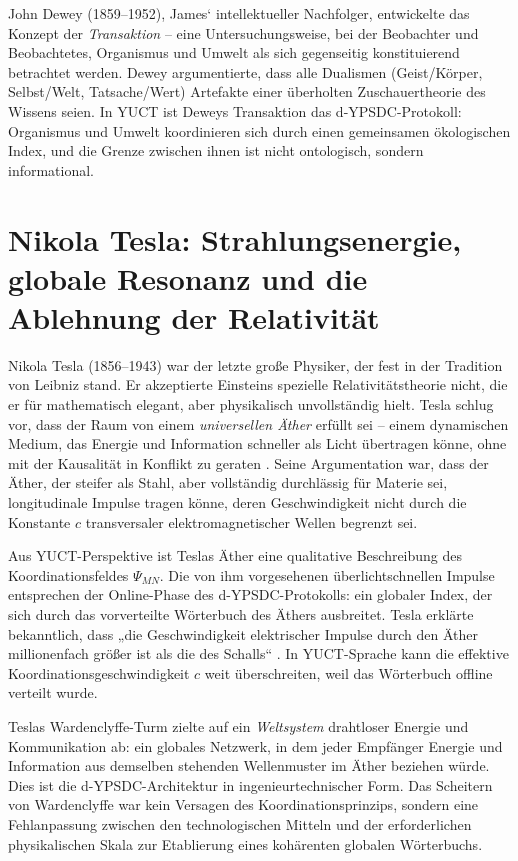 \documentclass[12pt,a4paper]{article}
\begin{document}
	John Dewey (1859–1952), James‘ intellektueller Nachfolger, entwickelte das Konzept der \emph{Transaktion} – eine Untersuchungsweise, bei der Beobachter und Beobachtetes, Organismus und Umwelt als sich gegenseitig konstituierend betrachtet werden. Dewey argumentierte, dass alle Dualismen (Geist/Körper, Selbst/Welt, Tatsache/Wert) Artefakte einer überholten Zuschauertheorie des Wissens seien. In YUCT ist Deweys Transaktion das d-YPSDC-Protokoll: Organismus und Umwelt koordinieren sich durch einen gemeinsamen ökologischen Index, und die Grenze zwischen ihnen ist nicht ontologisch, sondern informational.
	
	\section{Nikola Tesla: Strahlungsenergie, globale Resonanz und die Ablehnung der Relativität}
	
	Nikola Tesla (1856–1943) war der letzte große Physiker, der fest in der Tradition von Leibniz stand. Er akzeptierte Einsteins spezielle Relativitätstheorie nicht, die er für mathematisch elegant, aber physikalisch unvollständig hielt. Tesla schlug vor, dass der Raum von einem \emph{universellen Äther} erfüllt sei – einem dynamischen Medium, das Energie und Information schneller als Licht übertragen könne, ohne mit der Kausalität in Konflikt zu geraten \cite{Tesla1932}. Seine Argumentation war, dass der Äther, der steifer als Stahl, aber vollständig durchlässig für Materie sei, longitudinale Impulse tragen könne, deren Geschwindigkeit nicht durch die Konstante \(c\) transversaler elektromagnetischer Wellen begrenzt sei.
	
	Aus YUCT-Perspektive ist Teslas Äther eine qualitative Beschreibung des Koordinationsfeldes \(\Psi_{MN}\). Die von ihm vorgesehenen überlichtschnellen Impulse entsprechen der Online-Phase des d-YPSDC-Protokolls: ein globaler Index, der sich durch das vorverteilte Wörterbuch des Äthers ausbreitet. Tesla erklärte bekanntlich, dass „die Geschwindigkeit elektrischer Impulse durch den Äther millionenfach größer ist als die des Schalls“ \cite{Tesla1907}. In YUCT-Sprache kann die effektive Koordinationsgeschwindigkeit \(c\) weit überschreiten, weil das Wörterbuch offline verteilt wurde.
	
	Teslas Wardenclyffe-Turm zielte auf ein \emph{Weltsystem} drahtloser Energie und Kommunikation ab: ein globales Netzwerk, in dem jeder Empfänger Energie und Information aus demselben stehenden Wellenmuster im Äther beziehen würde. Dies ist die d-YPSDC-Architektur in ingenieurtechnischer Form. Das Scheitern von Wardenclyffe war kein Versagen des Koordinationsprinzips, sondern eine Fehlanpassung zwischen den technologischen Mitteln und der erforderlichen physikalischen Skala zur Etablierung eines kohärenten globalen Wörterbuchs.
	
\end{document}
